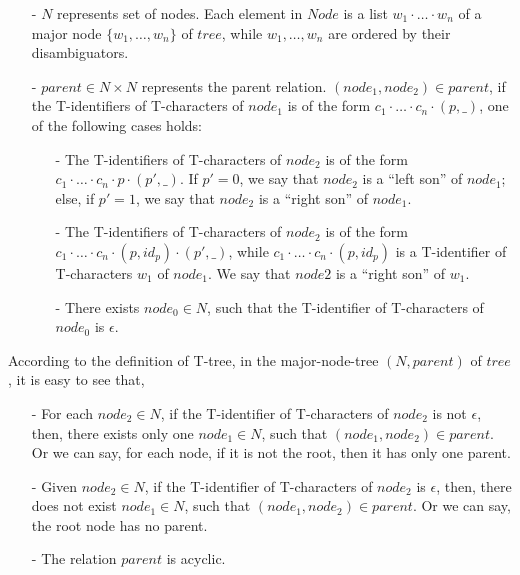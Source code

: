\begin{itemize}
\setlength{\itemsep}{0.5pt}
\item[-] $N$ represents set of nodes. Each element in $Node$ is a list $w_1 \cdot \ldots \cdot w_n$ of a major node $\{ w_1,\ldots,w_n \}$ of $tree$, while $w_1,\ldots,w_n$ are ordered by their disambiguators.

\item[-] $parent \in N \times N$ represents the parent relation. $(node_1,node_2) \in parent$, if the T-identifiers of T-characters of $node_1$ is of the form $c_1 \cdot \ldots \cdot c_n \cdot (p,\_)$, one of the following cases holds:

    \begin{itemize}
    \setlength{\itemsep}{0.5pt}
    \item[-] The T-identifiers of T-characters of $node_2$ is of the form $c_1 \cdot \ldots \cdot c_n \cdot p \cdot (p',\_)$. If $p'=0$, we say that $node_2$ is a ``left son'' of $node_1$; else, if $p'=1$, we say that $node_2$ is a ``right son'' of $node_1$.

    \item[-] The T-identifiers of T-characters of $node_2$ is of the form $c_1 \cdot \ldots \cdot c_n \cdot (p,id_p) \cdot (p',\_)$, while $c_1 \cdot \ldots \cdot c_n \cdot (p,id_p)$ is a T-identifier of T-characters $w_1$ of $node_1$. We say that $node2$ is a ``right son'' of $w_1$.

    \item[-] There exists $node_0 \in N$, such that the T-identifier of T-characters of $node_0$ is $\epsilon$.
    \end{itemize}
\end{itemize}

According to the definition of T-tree, in the major-node-tree $(N,parent)$ of $tree$, it is easy to see that,

\begin{itemize}
\setlength{\itemsep}{0.5pt}
\item[-] For each $node_2 \in N$, if the T-identifier of T-characters of $node_2$ is not $\epsilon$, then, there exists only one $node_1 \in N$, such that $(node_1,node_2) \in parent$. Or we can say, for each node, if it is not the root, then it has only one parent.

\item[-] Given $node_2 \in N$, if the T-identifier of T-characters of $node_2$ is $\epsilon$, then, there does not exist $node_1 \in N$, such that $(node_1,node_2) \in parent$. Or we can say, the root node has no parent.

\item[-] The relation $parent$ is acyclic.
\end{itemize}

